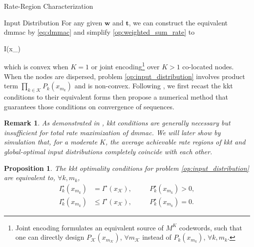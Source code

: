 \documentclass[journal]{IEEEtran}
\newtheorem{proposition}{Proposition}
\newtheorem{remark}{Remark}
\begin{document}
\begin{section}{Rate-Region Characterization}
	\begin{subsection}{Input Distribution}
		For any given $\boldsymbol{w}$ and $\boldsymbol{t}$, we can construct the equivalent \gls{dmmac} by \eqref{eq:dmmac} and simplify \eqref{op:weighted_sum_rate} to
		\begin{maxi!}
			{}{I(x_{})}{\label{op:input_distribution}}{}
			\addConstraint{\eqref{co:sum_probability},\eqref{co:nonnegative_probability},}
		\end{maxi!}
		which is convex when $K=1$ or joint encoding\footnote{Joint encoding formulates an equivalent source of $M^K$ codewords, such that one can directly design $P_{\mathcal{K}}(x_{m_{\mathcal{K}}})$, $\forall m_{\mathcal{K}}$ instead of $P_k(x_{m_k})$, $\forall k,m_k$.} over $K>1$ co-located nodes.
		When the nodes are dispersed, problem \eqref{op:input_distribution} involves product term $\prod_{k \in \mathcal{K}} P_k(x_{m_k})$ and is non-convex.
		Following \cite{Rezaeian2004}, we first recast the \gls{kkt} conditions to their equivalent forms then propose a numerical method that guarantees those conditions on convergence of sequences.
		\begin{remark}
			As demonstrated in \cite{Buhler2011}, \gls{kkt} conditions are generally necessary but insufficient for total rate maximization of \gls{dmmac}.
			We will later show by simulation that, for a moderate $K$, the average achievable rate regions of \gls{kkt} and global-optimal input distributions completely coincide with each other.
			\label{re:input_kkt_distribution}
		\end{remark}
		\begin{proposition}
			The \gls{kkt} optimality conditions for problem \eqref{op:input_distribution} are equivalent to, $\forall k,m_k$,
			\begin{subequations}
				\label{eq:input_kkt_condition}
				\begin{alignat}{2}
					I_k^\star(x_{m_k}) & = I^\star(x_{\mathcal{K}}), \quad   &  & P_k^\star(x_{m_k}) > 0,\label{eq:probable_states} \\
					I_k^\star(x_{m_k}) & \le I^\star(x_{\mathcal{K}}), \quad &  & P_k^\star(x_{m_k}) = 0.\label{eq:dropped_states}
				\end{alignat}
			\end{subequations}
			\label{pr:input_kkt_condition}
		\end{proposition}


\end{subsection}
\end{section}
\end{document}
